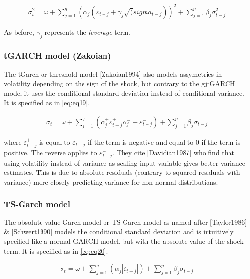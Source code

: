 \documentclass[a4paper, twoside]{templates/ociamthesis}
\begin{document}
\begin{align}
\sigma_t^2 = \omega + \sum\limits_{j=1}^q (\alpha_j (\varepsilon_{t-j}+ \gamma_j \sqrt(sigma_{t-j}))^2 + \sum\limits_{j = 1}^p \beta_j \sigma_{t-j}^2
 \label{eq:eq18}
\end{align}

As before, \(\gamma_j\) represents the \emph{leverage} term.

\hypertarget{tgarch-model-zakoian}{%
\subsubsection{tGARCH model (Zakoian)}\label{tgarch-model-zakoian}}

The tGarch or threshold model {[}Zakoian1994{]} also models assymetries in volatility depending on the sign of the shock, but contrary to the gjrGARCH model it uses the conditional standard deviation instead of conditional variance. It is specified as in \eqref{eq:eq19}.

\begin{align}
\sigma_t = \omega + \sum\limits_{j=1}^q (\alpha_j^+ \varepsilon_{t-j}^+ \alpha_j^{-} + \varepsilon_{t-j}^{-}) + \sum\limits_{j = 1}^p \beta_j \sigma_{t-j}
 \label{eq:eq19}
\end{align}

where \(\varepsilon_{t-j}^+\) is equal to \(\varepsilon_{t-j}\) if the term is negative and equal to 0 if the term is positive. The reverse applies to \(\varepsilon_{t-j}^-\). They cite {[}Davidian1987{]} who find that using volatility instead of variance as scaling input variable gives better variance estimates. This is due to absolute residuals (contrary to squared residuals with variance) more closely predicting variance for non-normal distributions.

\hypertarget{ts-garch-model}{%
\subsubsection{TS-Garch model}\label{ts-garch-model}}

The absolute value Garch model or TS-Garch model as named after {[}Taylor1986{]} \& {[}Schwert1990{]} models the conditional standard deviation and is intuitively specified like a normal GARCH model, but with the absolute value of the shock term. It is specified as in \eqref{eq:eq20}.

\begin{align}
\sigma_t = \omega + \sum\limits_{j=1}^q (\alpha_j \left|\varepsilon_{t-j}\right|) +
\sum\limits_{j = 1}^p \beta_j \sigma_{t-j}
 \label{eq:eq20}
\end{align}
\end{document}
